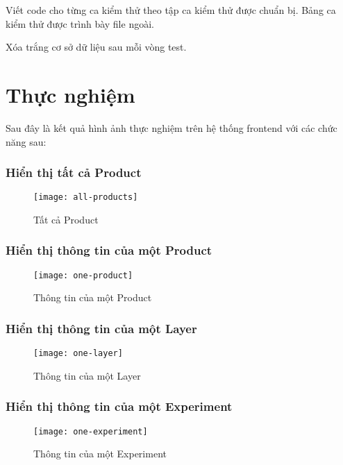 Viết code cho từng ca kiểm thử theo tập ca kiểm thử được chuẩn bị. Bảng ca kiểm thử được trình bày file ngoài.

Xóa trắng cơ sở dữ liệu sau mỗi vòng test.

\section{Thực nghiệm}

Sau đây là kết quả hình ảnh thực nghiệm trên hệ thống frontend với các chức năng sau:

\subsubsection{Hiển thị tất cả Product}

\begin{figure}[H]
	\centering
	\texttt{[image: all-products]}
	\caption{Tất cả Product}
\end{figure}

\subsubsection{Hiển thị thông tin của một Product}

\begin{figure}[H]
	\centering
	\texttt{[image: one-product]}
	\caption{Thông tin của một Product}
\end{figure}

\subsubsection{Hiển thị thông tin của một Layer}

\begin{figure}[H]
	\centering
	\texttt{[image: one-layer]}
	\caption{Thông tin của một Layer}
\end{figure}

\subsubsection{Hiển thị thông tin của một Experiment}

\begin{figure}[H]
	\centering
	\texttt{[image: one-experiment]}
	\caption{Thông tin của một Experiment}
\end{figure}
